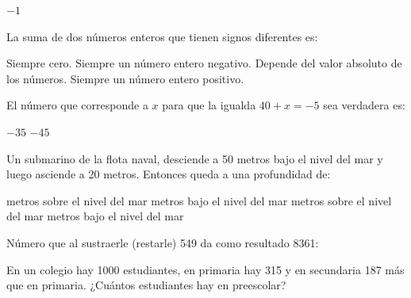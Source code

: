 \documentclass[10pt,letterpaper,addpoints]{exam}
\begin{document}
\begin{multicols}{2}
\begin{questions}
\begin{oneparchoices}
\CorrectChoice $-1$
\end{oneparchoices}
\question La suma de dos números enteros que tienen signos diferentes es:
\begin{choices}
\choice  Siempre cero.
\choice Siempre un número entero negativo.
\CorrectChoice Depende del valor absoluto de los números.
\choice Siempre un número entero positivo.
\end{choices}
\question El número que corresponde a $x$ para que la igualda $40 + x = -5$ \quad sea verdadera es:

\begin{oneparchoices}
\choice $-35$
\CorrectChoice $-45$
\end{oneparchoices}
\question Un submarino de la flota naval, desciende a 50 metros bajo el nivel del mar y luego asciende a 20 metros. Entonces queda a una profundidad de:
\begin{choices}
 metros sobre el nivel del mar
 metros bajo el nivel del mar
 metros sobre el nivel del mar
 metros bajo el nivel del mar
\end{choices}
\question
Número que al sustraerle (restarle) 549 da como resultado 8361:

\begin{oneparchoices}
\end{oneparchoices}
\question 
En un colegio hay 1000 estudiantes, en primaria hay 315 y en secundaria 187 más que en primaria. ¿Cuántos estudiantes hay en preescolar?

\begin{oneparchoices}
\end{oneparchoices}
\end{questions}
\end{multicols}
\end{document}
